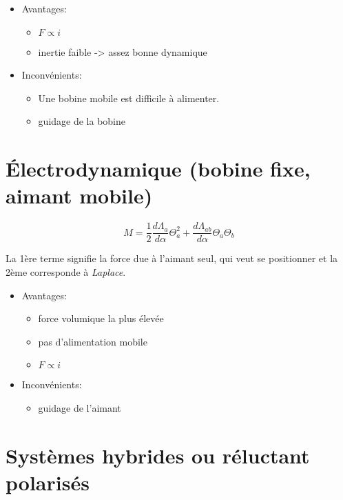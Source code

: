 \documentclass[a4paper,12pt,notitlepage]{article}
\begin{document}
    \begin{itemize}
        \item Avantages:
            \begin{itemize}
                \item $ F \propto i $
                \item inertie faible -> assez bonne dynamique
            \end{itemize}
        \item Inconvénients:
            \begin{itemize}
                \item Une bobine mobile est difficile à alimenter.
                \item guidage de la bobine
            \end{itemize}
    \end{itemize}

    \section{Électrodynamique (bobine fixe, aimant mobile)}

    \begin{equation}
        M = \frac{1}{2} \frac{d\Lambda_{a}}{d\alpha}\Theta_a^2
            + \frac{d\Lambda_{ab}}{d\alpha}\Theta_a \Theta_b
        \label{moment_bobine_fixe}
    \end{equation}

    La 1ère terme signifie la force due à l'aimant seul, qui veut se positionner
    et la 2ème corresponde à \emph{Laplace}.

    \begin{itemize}
        \item Avantages:
            \begin{itemize}
                \item force volumique la plus élevée
                \item pas d'alimentation mobile
                \item $ F \propto i $
            \end{itemize}
        \item Inconvénients:
            \begin{itemize}
                \item guidage de l'aimant
            \end{itemize}
    \end{itemize}

    \section{Systèmes hybrides ou réluctant polarisés}
\end{document}
